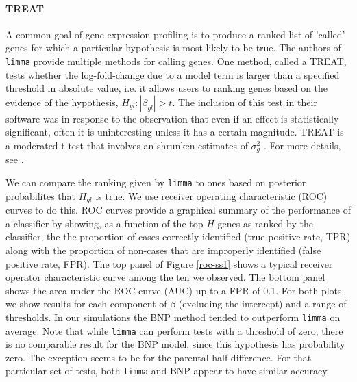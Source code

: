 \paragraph{TREAT}
A common goal of gene expression profiling is to produce a ranked list of 'called' genes for which a particular hypothesis is most likely to be true. The authors of \texttt{limma} provide multiple methods for calling genes. One method, called a TREAT, tests whether the log-fold-change due to a model term is larger than a specified threshold in absolute value, i.e. it allows users to ranking genes based on the evidence of the hypothesis, $H_{gl}:|\beta_{gl}|>t$. The inclusion of this test in their software was in response to the observation that even if an effect is statistically significant, often it is uninteresting unless it has a certain magnitude. TREAT is a moderated t-test that involves an shrunken estimates of $\sigma^2_g$ \citep{treat}. For more details, see \citet{treat}.

We can compare the ranking given by \texttt{limma} to ones based on posterior probabilites that $H_{gl}$ is true. We use receiver operating characteristic (ROC) curves to do this. ROC curves provide a graphical summary of the performance of a classifier by showing, as a function of the top $H$ genes as ranked by the classifier, the the proportion of cases correctly identified (true positive rate, TPR) along with the proportion of non-cases that are improperly identified (false positive rate, FPR). The top panel of Figure \ref{roc-ss1} shows a typical receiver operator characteristic curve among the ten we observed. The bottom panel shows the area under the ROC curve (AUC) up to a FPR of 0.1. For both plots we show results for each component of $\beta$ (excluding the intercept) and a range of thresholds. In our simulations the BNP method tended to outperform \texttt{limma} on average. Note that while \texttt{limma} can perform tests with a threshold of zero, there is no comparable result for the BNP model, since this hypothesis has probability zero. The exception seems to be for the parental half-difference. For that particular set of tests, both \texttt{limma} and BNP appear to have similar accuracy.

